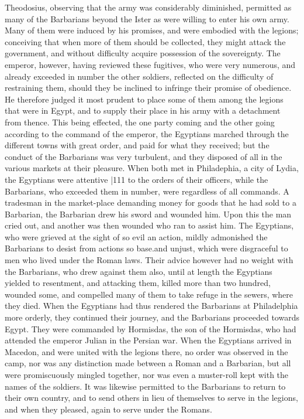 Theodosius, observing that the army was considerably diminished, permitted as many of the Barbarians beyond the Ister as were willing to enter his own army. Many of them were induced by his promises, and were embodied with the legions; conceiving that when more of them should be collected, they might attack the government, and without difficulty acquire possession of the sovereignty. The emperor, however, having reviewed these fugitives, who were very numerous, and already exceeded in number the other soldiers, reflected on the difficulty of restraining them, should they be inclined to infringe their promise of obedience. He therefore judged it most prudent to place some of them among the legions that were in Egypt, and to supply their place in his army with a detachment from thence. This being effected, the one party coming and the other going according to the command of the emperor, the Egyptians marched through the different towns with great order, and paid for what they received;
but the conduct of the Barbarians was very turbulent, and they disposed of all in the various markets at their pleasure. When both met in Philadephia, a city of Lydia, the Egyptians were attentive
|111
to the orders of their officers, while the Barbarians, who exceeded them in number, were regardless of all commands. A tradesman in the market-place demanding money for goods that he had sold to a Barbarian, the Barbarian drew his sword and wounded him. Upon this the man cried out, and another was then wounded who ran to assist him. The Egyptians, who were grieved at the sight of so evil an action, mildly admonished the Barbarians to desist from actions so base.and unjust, which were disgraceful to men who lived under the Roman laws. Their advice however had no weight with the Barbarians, who drew against them also, until at length the Egyptians yielded to resentment, and attacking them, killed more than two hundred, wounded some, and compelled many of them to take refuge in the sewers, where they died. When the Egyptians had thus rendered the Barbarians at Philadelphia more orderly, they continued their journey, and the Barbarians proceeded towards Egypt. They were commanded by Hormisdas, the son of the Hormisdas, who had attended the emperor Julian in the Persian war. When the Egyptians arrived in Macedon, and were united with the legions there, no order was observed in the camp, nor was any distinction made between a Roman and a Barbarian, but all were promiscuously mingled together, nor was even a muster-roll kept with the names of the soldiers. It was likewise permitted to the Barbarians to return to their own country, and to send others in lieu of themselves to serve in the legions, and when they pleased, again to serve under the Romans.

